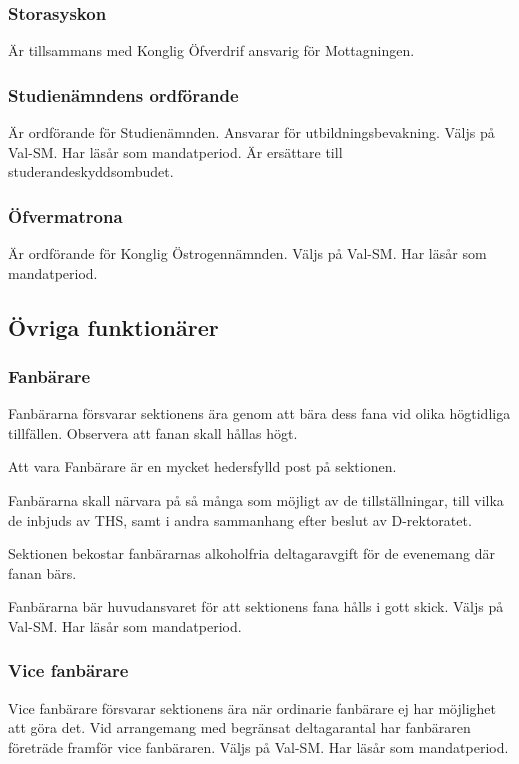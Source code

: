 \documentclass[a4paper,12pt]{article}
\begin{document}
\subsubsection{Storasyskon}

Är tillsammans med Konglig Öfverdrif ansvarig för Mottagningen.

\subsubsection{Studienämndens ordförande}

Är ordförande för Studienämnden. Ansvarar för utbildningsbevakning. Väljs på Val-SM. Har läsår som mandatperiod. Är ersättare till studerandeskyddsombudet.

\subsubsection{Öfvermatrona}

Är ordförande för Konglig Östrogennämnden. Väljs på Val-SM. Har läsår som
mandatperiod.

\subsection{Övriga funktionärer}

\subsubsection{Fanbärare}

Fanbärarna försvarar sektionens ära genom att bära dess fana vid olika högtidliga tillfällen. Observera att fanan skall hållas högt.

Att vara Fanbärare är en mycket hedersfylld post på sektionen.

Fanbärarna skall närvara på så många som möjligt av de tillställningar, till vilka de inbjuds av THS, samt i andra sammanhang efter beslut av D-rektoratet.

Sektionen bekostar fanbärarnas alkoholfria deltagaravgift för de evenemang där fanan bärs.

Fanbärarna bär huvudansvaret för att sektionens fana hålls i gott skick. Väljs på Val-SM. Har läsår som mandatperiod.

\subsubsection{Vice fanbärare}

Vice fanbärare försvarar sektionens ära när ordinarie fanbärare ej har möjlighet att göra det. Vid arrangemang med begränsat deltagarantal har fanbäraren företräde framför vice fanbäraren. Väljs på Val-SM. Har läsår som mandatperiod.
\end{document}
